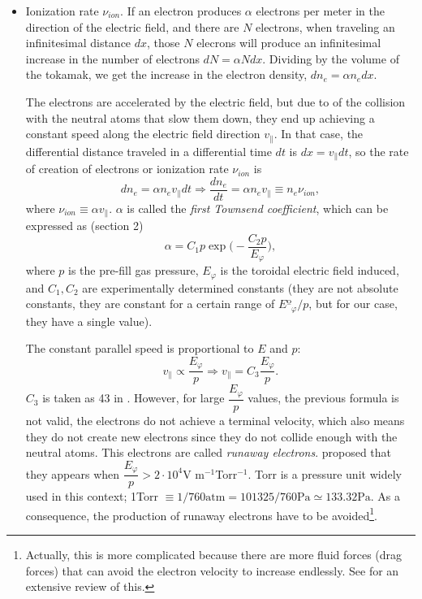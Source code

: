 \documentclass[a4paper,12pt,oneside]{book}
\begin{document}
\begin{itemize}

	\item Ionization rate $\nu_{ion}$. If an electron produces $\alpha$ electrons per meter in the direction of the electric field, and there are $N$ electrons, when traveling an infinitesimal distance $dx$, those $N$ elecrons will produce an infinitesimal increase in the number of electrons $dN=\alpha N dx$. Dividing by the volume of the tokamak, we get the increase in the electron density, $dn_e=\alpha n_e dx$. 

The electrons are accelerated by the electric field, but due to of the collision with the neutral atoms that slow them down, they end up achieving a constant speed along the electric field direction $v_{\parallel}$. In that case, the differential distance traveled in a differential time $dt$ is $dx=v_{\parallel} dt$, so the rate of creation of electrons or ionization rate $\nu_{ion}$ is 
%
	\begin{equation}\label{nu ion}
dn_e=\alpha n_e v_{\parallel} dt \Rightarrow \dfrac{dn_e}{dt}=\alpha n_e v_{\parallel} \equiv n_e \nu_{ion},
	\end{equation}
where $\nu_{ion} \equiv \alpha v_{\parallel}$. $\alpha$ is called the \textit{first Townsend coefficient}, which can be expressed as \cite{KimThesis} (section 2)
%
	\begin{equation}\label{ec_def_alfa}
\alpha = C_1 p \exp \Big(-\dfrac{C_2 p}{E_\varphi} \Big),
	\end{equation}
where $p$ is the pre-fill gas pressure, $E_\varphi$ is the toroidal electric field induced, and $C_1,C_2$ are experimentally determined constants (they are not absolute constants, they are constant for a certain range of $Eº_\varphi/p$, but for our case, they have a single value). 

The constant parallel speed is proportional to $E$ and $p$:
%
\begin{equation}
v_\parallel \propto \dfrac{E_\varphi}{p} \Rightarrow v_\parallel = C_3 \dfrac{E_\varphi}{p}.
\end{equation}
$C_3$ is taken as 43 in \cite{Lloyd_1991}. However, for large $\dfrac{E_\varphi}{p}$ values, the previous formula is not valid, the electrons do not achieve a terminal velocity, which also means they do not create new electrons since they do not collide enough with the neutral atoms. This electrons are called \textit{runaway electrons}. \cite{Lloyd_1991} proposed that they appears when $\dfrac{E_\varphi}{p}>2 \cdot 10^4 $V m$^{-1}$Torr$^{-1}$. Torr is a pressure unit widely used in this context; 1Torr $\equiv 1/760 \text{atm}=101325/760 \text{Pa} \simeq 133.32 \text{Pa}$. As a consequence, the production of runaway electrons have to be avoided\footnote{Actually, this is more complicated because there are more fluid forces (drag forces) that can avoid the electron velocity to increase endlessly. See \cite{ITER_2019} for an extensive review of this.}.


\end{itemize}
\end{document}
